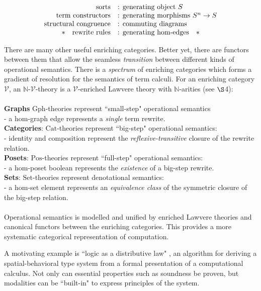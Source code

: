 \documentclass[a4paper,UKenglish]{article}
\theoremstyle{definition}
\newcommand{\Gph}{\mathrm{Gph}}
\newcommand{\Set}{\mathrm{Set}}
\newcommand{\Cat}{\mathrm{Cat}}
\newcommand{\Pos}{\mathrm{Pos}}
\newcommand{\NN}{\mathbb{N}}
\newcommand{\V}{\mathscr{V}}
\begin{document}
\[\begin{array}{rl}
\text{sorts} & \text{: generating object } S\\
\text{term constructors} & \text{: generating morphisms } S^n \to S\\
\text{structural congruence} & \text{: commuting diagrams}\\
\text{\textasteriskcentered \quad rewrite rules} & \text{: generating hom-edges\quad\textasteriskcentered}\\
\end{array}\]

There are many other useful enriching categories. Better yet, there are functors between them that allow the seamless \textit{transition} between different kinds of operational semantics. There is a \textit{spectrum} of enriching categories which forms a gradient of resolution for the semantics of term calculi. For an enriching category $\V$, an $\NN$-$\V$-theory is a $\V$-enriched Lawvere theory with $\NN$-arities (see $\S$4):\\\\
\textbf{Graphs} $\Gph$-theories represent ``small-step" operational semantics\\ - a hom-graph edge represents a \textit{single} term rewrite.\\
\textbf{Categories}: $\Cat$-theories represent ``big-step" operational semantics:\\ - identity and composition represent the \textit{reflexive-transitive} closure of the rewrite relation.\\
\textbf{Posets}: $\Pos$-theories represent ``full-step" operational semantics:\\ - a hom-poset boolean represents the \textit{existence} of a big-step rewrite.\\
\textbf{Sets}: $\Set$-theories represent denotational semantics:\\ - a hom-set element represents an \textit{equivalence class} of the symmetric closure of the big-step relation.\\\\
Operational semantics is modelled and unified by enriched Lawvere theories and canonical functors between the enriching categories. This provides a more systematic categorical representation of computation.

A motivating example is ``logic as a distributive law" \cite{ladl}, an algorithm for deriving a spatial-behavioral type system from a formal presentation of a computational calculus. Not only can essential properties such as soundness be proven, but modalities can be ``built-in" to express principles of the system.
\end{document}
